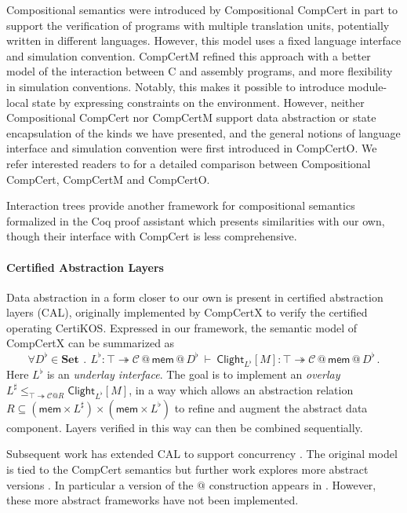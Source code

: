 \documentclass[acmsmall,screen,review,anonymous]{acmart}
\newcommand{\kw}[1]{\ensuremath{ \mathsf{#1} }}
\begin{document}
Compositional semantics were introduced by
Compositional CompCert \cite{compcompcert}
in part to support the verification of
programs with multiple translation units,
potentially written in different languages.
However,
this model uses a fixed language interface and simulation convention.
CompCertM \cite{compcertm} refined this approach
with a better model of the interaction between
C and assembly programs,
and more flexibility in simulation conventions.
Notably,
this makes it possible to introduce module-local state
by expressing constraints on the environment.
However, neither Compositional CompCert nor CompCertM
support data abstraction or state encapsulation
of the kinds we have presented,
and the general notions of
language interface and simulation convention
were first introduced in CompCertO.
We refer interested readers to \citet{compcerto}
for a detailed comparison between Compositional CompCert,
CompCertM and CompCertO.

Interaction trees \cite{itree,itrees} provide
another framework for compositional semantics
formalized in the Coq proof assistant
which presents similarities with our own,
though their interface with CompCert is less comprehensive.

\paragraph{Certified Abstraction Layers}

Data abstraction in a form closer to our own
is present in certified abstraction layers (CAL),
originally implemented by CompCertX \cite{popl15}
to verify the certified operating CertiKOS.
Expressed in our framework,
the semantic model of CompCertX can be summarized as
\[
  \forall D^\flat \in \mathbf{Set}
  \: \mathbin. \:
  L^\flat :
    \top \twoheadrightarrow
    \mathcal{C} \mathbin@ \kw{mem} \mathbin@ D^\flat
  \: \vdash \:
  \kw{Clight}_{L^\flat}[M] :
    \top \twoheadrightarrow
    \mathcal{C} \mathbin@ \kw{mem} \mathbin@ D^\flat
  \,.
\]
Here $L^\flat$ is an \emph{underlay interface}.
The goal is to implement an \emph{overlay}
$
  L^\sharp \le_{\top \twoheadrightarrow \mathcal{C}@R}
    \kw{Clight}_{L^\flat}[M]
$,
in a way which allows an abstraction relation
$R \subseteq (\kw{mem} \times L^\sharp) \times (\kw{mem} \times L^\flat)$
to refine and augment the abstract data component.
Layers verified in this way can then be combined sequentially.

Subsequent work has extended CAL to support concurrency \cite{ccal}.
The original model is tied to the CompCert semantics but
further work explores more abstract versions \cite{rbgs-cal,popl22}.
In particular a version of the $\mathbin@$ construction appears in \citet{rbgs-cal}.
However, these more abstract frameworks
have not been implemented.
\end{document}
